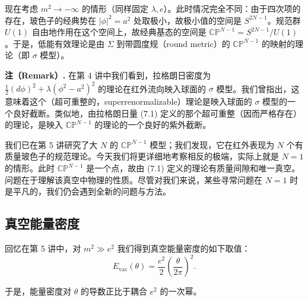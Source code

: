 
现在考虑 $m^2\to-\infty$ 的情形（同样固定 $\lambda,e$）。此时情况完全不同：由于四次项的存在，玻色子的经典势在 $|\phi|^2=a^2$ 处取极小，故极小值的空间是 $S^{2N-1}$。规范群 $U(1)$ 自由地作用在这个空间上，故经典基态的空间是 $\mathbb{CP}^{N-1}=S^{2N-1}/U(1)$。于是，低能有效理论是由 $\Sigma$ 到带圆度规（round metric）的 $\mathbb{CP}^{N-1}$ 的映射的理论（即 $\sigma$ 模型）。

\textbf{注（Remark）.} 在第 4 讲中我们看到，拉格朗日密度为 $\frac12(d\phi)^2+\lambda(\phi^2-a^2)^2$ 的理论在红外流向映入球面的 $\sigma$ 模型。我们曾指出，这意味着这个（超可重整的，superrenormalizable）理论是映入球面的 $\sigma$ 模型的一个良好截断。类似地，由拉格朗日量 (7.1) 定义的那个超可重整（因而严格存在）的理论，是映入 $\mathbb{CP}^{N-1}$ 的理论的一个良好的紫外截断。

我们已在第 5 讲研究了大 $N$ 的 $\mathbb{CP}^{N-1}$ 模型；我们发现，它在红外表现为 $N$ 个有质量玻色子的规范理论。今天我们将更详细地考察相反的极端，实际上就是 $N=1$ 的情形。此时 $\mathbb{CP}^{N-1}$ 是一个点，故由 (7.1) 定义的理论有质量间隙和唯一真空。问题在于理解该真空中物理的性质。尽管对我们来说，某些寻常问题在 $N=1$ 时是平凡的，我们仍会遇到全新的问题与方法。

\subsection{真空能量密度}

回忆在第 5 讲中，对 $m^2\gg e^2$ 我们得到真空能量密度的如下取值：
\begin{equation}
  \tag{7.2}
  \label{eq:7-2}
  E_{\mathrm{vac}}(\theta)=\frac{e^2}{2}\left(\frac{\theta}{2\pi}\right)^2 .
\end{equation}

于是，能量密度对 $\theta$ 的导数正比于耦合 $e^2$ 的一次幂。

